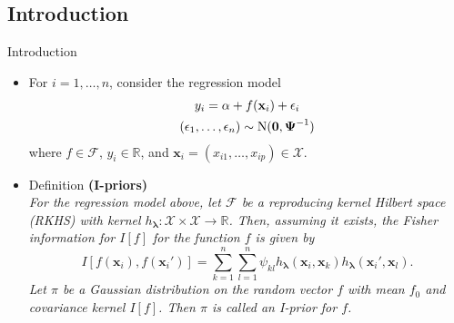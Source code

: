\documentclass[]{beamer}\usepackage[]{graphicx}\usepackage[]{color}
\newcommand{\N}{\text{\normalfont N}}
\begin{document}

\subsection{Introduction}

\begin{frame}{Introduction}
	\vspace{-4mm}

	\begin{itemize}
		\item For $i = 1, \dots, n$, consider the regression model
		\begin{align}\label{eq:linmod}
			\begin{gathered}
				y_i = \alpha + f(\mathbf x_i) + \epsilon_i \\
				(\epsilon_1, \dots, \epsilon_n) \sim \N(\mathbf 0, \boldsymbol{\Psi}^{-1})
			\end{gathered}
		\end{align}
		where $f \in \mathcal F$, $y_i \in \mathbb R$, and $\mathbf x_i = (x_{i1}, \dots, x_{ip}) \in \mathcal X$.

	\pause
	\item Definition \textbf{(I-priors)} \\
	\textit{For the regression model above, let $\mathcal F$ be a reproducing kernel Hilbert space (RKHS) with kernel $h_{\boldsymbol\lambda}: \mathcal X \times \mathcal X \rightarrow \mathbb R$. Then, assuming it exists, the Fisher information for $I[f]$ for the function $f$ is given by
		\[
		I[f(\mathbf x_i), f(\mathbf x_i')] = \sum_{k=1}^n \sum_{l=1}^n \psi_{kl} h_{\boldsymbol\lambda}(\mathbf x_i, \mathbf x_k) h_{\boldsymbol\lambda}(\mathbf x_i', \mathbf x_l).
		\]
		Let $\pi$ be a Gaussian distribution on the random vector $f$ with mean $f_0$ and covariance kernel $I[f]$. Then $\pi$ is called an I-prior for $f$.
	}
	\end{itemize}
\end{frame}
\end{document}
